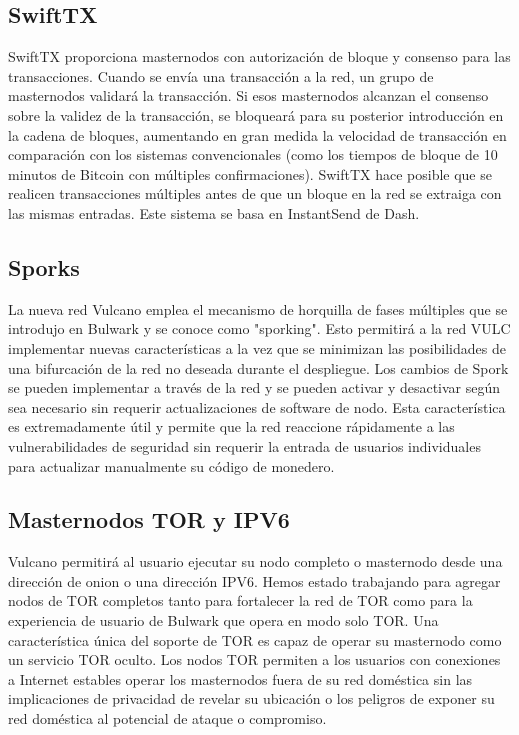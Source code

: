\documentclass[A4paper, 12pt]{article}
\begin{document}
\subsection{SwiftTX}
SwiftTX proporciona masternodos con autorización de bloque y consenso para las transacciones. Cuando se envía una transacción a la red, un grupo de masternodos validará la transacción.  Si esos masternodos alcanzan el consenso sobre la validez de la transacción, se bloqueará para su posterior introducción en la cadena de bloques, aumentando en gran medida la velocidad de transacción en comparación con los sistemas convencionales (como los tiempos de bloque de 10 minutos de Bitcoin con múltiples confirmaciones). SwiftTX hace posible que se realicen transacciones múltiples antes de que un bloque en la red se extraiga con las mismas entradas.  Este sistema se basa en InstantSend de Dash.

\subsection{Sporks}
La nueva red Vulcano emplea el mecanismo de horquilla de fases múltiples que se introdujo en Bulwark y se conoce como "sporking". Esto permitirá a la red VULC implementar nuevas características a la vez que se minimizan las posibilidades de una bifurcación de la red no deseada durante el despliegue. Los cambios de Spork se pueden implementar a través de la red y se pueden activar y desactivar según sea necesario sin requerir actualizaciones de software de nodo. Esta característica es extremadamente útil y permite que la red reaccione rápidamente a las vulnerabilidades de seguridad sin requerir la entrada de usuarios individuales para actualizar manualmente su código de monedero.

\subsection{Masternodos TOR y IPV6}
Vulcano permitirá al usuario ejecutar su nodo completo o masternodo desde una dirección de onion o una dirección IPV6. Hemos estado trabajando para agregar nodos de TOR completos tanto para fortalecer la red de TOR como para la experiencia de usuario de Bulwark que opera en modo solo TOR. Una característica única del soporte de TOR es capaz de operar su masternodo como un servicio TOR oculto.  Los nodos TOR permiten a los usuarios con conexiones a Internet estables operar los masternodos fuera de su red doméstica sin las implicaciones de privacidad de revelar su ubicación o los peligros de exponer su red doméstica al potencial de ataque o compromiso.
 
\end{document}
